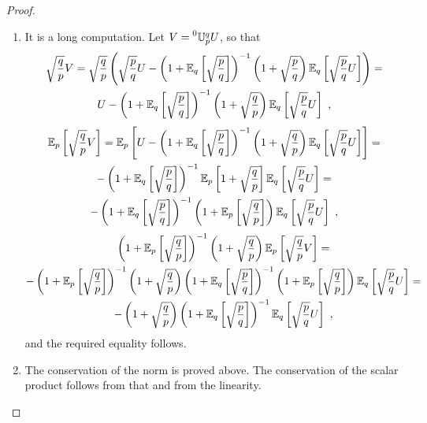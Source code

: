 \documentclass[12pt,a4paper]{amsart}
\begin{document}
  \begin{proof}
    \begin{enumerate}
    \item It is a long computation. Let $V = \prescript{0}{}{\mathbb U}_{p}^{q} U$, so that
     \begin{multline*}
\sqrt \frac qp V = 
\sqrt{\frac qp}\left(\sqrt{\frac pq} U  -  \left(1 +  {\operatorname{\mathbb E}}_{q}\left[\sqrt{\frac pq}\right]\right)^{-1} \left(1 + \sqrt{\frac pq}\right) {\operatorname{\mathbb E}}_{q}\left[\sqrt{\frac pq}U\right]\right) = \\ U  -  \left(1 +  {\operatorname{\mathbb E}}_{q}\left[\sqrt{\frac pq}\right]\right)^{-1} \left(1 + \sqrt{\frac qp}\right) {\operatorname{\mathbb E}}_{q}\left[\sqrt{\frac pq}U\right] \ ,
      \end{multline*}
%
      \begin{multline*}
 {\operatorname{\mathbb E}}_{p}\left[\sqrt \frac qp V\right] = {\operatorname{\mathbb E}}_{p}\left[U  -  \left(1 +  {\operatorname{\mathbb E}}_{q}\left[\sqrt{\frac pq}\right]\right)^{-1} \left(1 + \sqrt{\frac qp}\right) {\operatorname{\mathbb E}}_{q}\left[\sqrt{\frac pq}U\right]\right] = \\ -  \left(1 +  {\operatorname{\mathbb E}}_{q}\left[\sqrt{\frac pq}\right]\right)^{-1} {\operatorname{\mathbb E}}_{p}\left[1 + \sqrt{\frac qp}\right] {\operatorname{\mathbb E}}_{q}\left[\sqrt{\frac pq}U\right] = \\ -  \left(1 +  {\operatorname{\mathbb E}}_{q}\left[\sqrt{\frac pq}\right]\right)^{-1} \left(1 + {\operatorname{\mathbb E}}_{p}\left[\sqrt{\frac qp}\right]\right) {\operatorname{\mathbb E}}_{q}\left[\sqrt{\frac pq}U\right] \ ,
      \end{multline*}
%
      \begin{multline*}
\left(1+{\operatorname{\mathbb E}}_{p}\left[\sqrt\frac qp\right]\right)^{-1} \left(1+ \sqrt\frac qp \right) {\operatorname{\mathbb E}}_{p}\left[\sqrt \frac qp V\right] = \\
- \left(1+{\operatorname{\mathbb E}}_{p}\left[\sqrt\frac qp\right]\right)^{-1} \left(1+ \sqrt\frac qp \right) \left(1 +  {\operatorname{\mathbb E}}_{q}\left[\sqrt{\frac pq}\right]\right)^{-1} \left(1 + {\operatorname{\mathbb E}}_{p}\left[\sqrt{\frac qp}\right]\right) {\operatorname{\mathbb E}}_{q}\left[\sqrt{\frac pq}U\right] = \\
-  \left(1+ \sqrt\frac qp \right) \left(1 +  {\operatorname{\mathbb E}}_{q}\left[\sqrt{\frac pq}\right]\right)^{-1} {\operatorname{\mathbb E}}_{q}\left[\sqrt{\frac pq}U\right] \ ,
      \end{multline*}
%
and the required equality follows.
    \item The conservation of the norm is proved above. The conservation of the scalar product follows from that and from the linearity.
    \end{enumerate}
  \end{proof}
\end{document}

